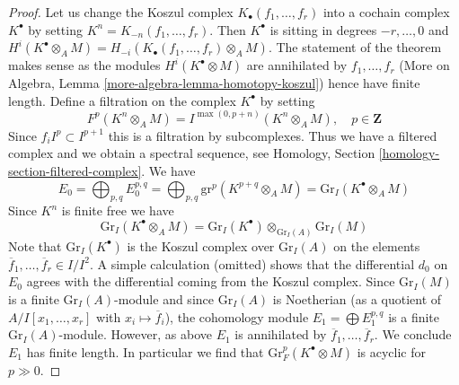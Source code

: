 \begin{proof}
Let us change the Koszul complex $K_\bullet(f_1, \ldots, f_r)$ into a cochain
complex $K^\bullet$ by setting $K^n = K_{-n}(f_1, \ldots, f_r)$.
Then $K^\bullet$ is sitting in degrees $-r, \ldots, 0$ and
$H^i(K^\bullet \otimes_A M) = H_{-i}(K_\bullet(f_1, \ldots, f_r) \otimes_A M)$.
The statement of the theorem makes sense as the modules
$H^i(K^\bullet \otimes M)$ are annihilated by $f_1, \ldots, f_r$
(More on Algebra, Lemma \ref{more-algebra-lemma-homotopy-koszul})
hence have finite length.
Define a filtration on the complex $K^\bullet$ by setting
$$
F^p(K^n \otimes_A M) =
I^{\max(0, p + n)}(K^n \otimes_A M),\quad p \in \mathbf{Z}
$$
Since $f_i I^p \subset I^{p + 1}$ this is a filtration by subcomplexes.
Thus we have a filtered complex and we obtain a spectral sequence, see
Homology, Section \ref{homology-section-filtered-complex}.
We have
$$
E_0 = \bigoplus\nolimits_{p, q} E_0^{p, q} =
\bigoplus\nolimits_{p, q} \text{gr}^p(K^{p + q} \otimes_A M) =
\text{Gr}_I(K^\bullet \otimes_A M)
$$
Since $K^n$ is finite free we have
$$
\text{Gr}_I(K^\bullet \otimes_A M) =
\text{Gr}_I(K^\bullet) \otimes_{\text{Gr}_I(A)} \text{Gr}_I(M)
$$
Note that $\text{Gr}_I(K^\bullet)$ is the Koszul
complex over $\text{Gr}_I(A)$ on the elements
$\overline{f}_1, \ldots, \overline{f}_r \in I/I^2$.
A simple calculation (omitted)
shows that the differential $d_0$ on $E_0$
agrees with the differential coming from the Koszul complex.
Since $\text{Gr}_I(M)$ is a finite $\text{Gr}_I(A)$-module
and since $\text{Gr}_I(A)$ is Noetherian (as a quotient
of $A/I[x_1, \ldots, x_r]$ with $x_i \mapsto \overline{f}_i$), the
cohomology module $E_1 = \bigoplus E_1^{p, q}$
is a finite $\text{Gr}_I(A)$-module. However, as above
$E_1$ is annihilated by $\overline{f}_1, \ldots, \overline{f}_r$.
We conclude $E_1$ has finite length.
In particular we find that $\text{Gr}^p_F(K^\bullet \otimes M)$ is
acyclic for $p \gg 0$.


\end{proof}
